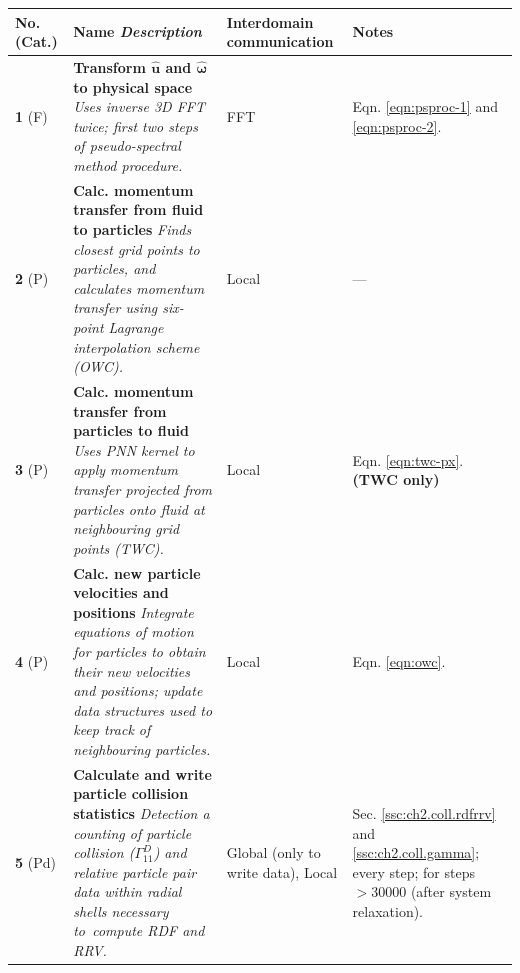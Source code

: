\documentclass{pracamgren}
\begin{document}
\begin{table}[!htbp]
\centering
\scriptsize
\begin{tabular}{p{10mm}p{75mm}p{25mm}p{27mm}}
\textbf{No.} \newline (Cat.) & \textbf{Name} \newline \emph{Description} & \textbf{Interdomain \newline communication} & \textbf{Notes} \\ \hline \hline
\rowcolor[RGB]{190,240,220} \textbf{1} \newline (F) & 
\textbf{Transform $\mathbf{\hat{u}}$ and $\boldsymbol{\hat{\omega}}$ to physical space} \newline \emph{Uses inverse 3D FFT twice; first two steps of pseudo-spectral method procedure.} & FFT & Eqn. \ref{eqn:psproc-1} and \ref{eqn:psproc-2}. \\ 
\rowcolor[RGB]{240,220,190} \textbf{2} \newline (P) & 
\textbf{Calc. momentum transfer from fluid to particles} \newline \emph{Finds closest grid points to particles, and calculates momentum transfer using six-point Lagrange interpolation scheme (OWC).} & Local & --- \\ 
\rowcolor[RGB]{240,190,150} \textbf{3} \newline (P) &
\textbf{Calc. momentum transfer from particles to fluid} \newline \emph{Uses PNN kernel to apply momentum transfer projected from particles onto fluid at neighbouring grid points (TWC).} & Local & Eqn. \ref{eqn:twc-px}. \newline \textbf{(TWC only)} \\ 
\rowcolor[RGB]{240,220,190} \textbf{4} \newline (P) &
\textbf{Calc. new particle velocities and positions} \newline \emph{Integrate equations of motion for particles to obtain their new velocities and positions; update data structures used to keep track of neighbouring particles.} & Local & Eqn. \ref{eqn:owc}. \\ 
\rowcolor[RGB]{240,240,170} \textbf{5} \newline (Pd) &
\textbf{Calculate and write particle collision statistics} \newline \emph{Detection a counting of particle collision ($\Gamma^D_{11}$) and relative particle pair data within radial shells necessary to~compute RDF and RRV.}  & Global (only to \newline write data), Local & Sec. \ref{ssc:ch2.coll.rdfrrv} and \ref{ssc:ch2.coll.gamma}; \newline every step;  for steps \newline $> 30 000$ (after \newline system relaxation). \\ 

\end{tabular}
\end{table}
\end{document}

